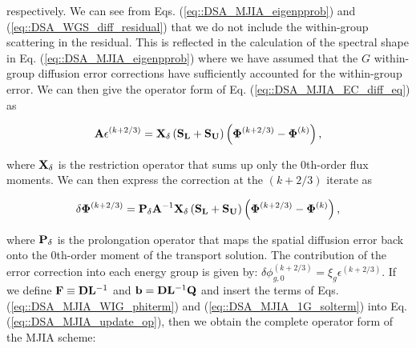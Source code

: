 \noindent respectively. We can see from Eqs. (\ref{eq::DSA_MJIA_eigenpprob}) and (\ref{eq::DSA_WGS_diff_residual}) that we do not include the within-group scattering in the residual. This is reflected in the calculation of the spectral shape in Eq. (\ref{eq::DSA_MJIA_eigenpprob}) where we have assumed that the $G$ within-group diffusion error corrections have sufficiently accounted for the within-group error. We can then give the operator form of Eq. (\ref{eq::DSA_MJIA_EC_diff_eq}) as

\begin{equation}
\label{eq::DSA_MJIA_1G_err_eq_op}
{\bf A} \epsilon^{(k+2/3)}  =  {\bf X}_{\delta}\left(   {\bf S_L} +  {\bf S_U} \right) \left(  {\bf \Phi}^{(k+2/3)} - {\bf \Phi}^{(k)}  \right),
\end{equation}

\noindent where ${\bf X}_{\delta}$ is the restriction operator that sums up only the 0th-order flux moments. We can then express the correction at the $(k+2/3)$ iterate as

\begin{equation}
\label{eq::DSA_MJIA_1G_solterm}
  \delta {\bf \Phi}^{(k+2/3)}  ={\bf P}_{\delta}{\bf A}^{-1}  {\bf X}_{\delta}\left(   {\bf S_L} +  {\bf S_U} \right) \left(  {\bf \Phi}^{(k+2/3)} - {\bf \Phi}^{(k)}  \right),
\end{equation}

\noindent where ${\bf P}_{\delta}$ is the prolongation operator that maps the spatial diffusion error back onto the 0th-order moment of the transport solution. The contribution of the error correction into each energy group is given by: $\delta \phi_{g,0}^{(k+2/3)}=\xi_g \epsilon^{(k+2/3)}$. If we define ${\bf F} \equiv {\bf D}{\bf L}^{-1} $ and ${\bf b} = {\bf D}{\bf L}^{-1}  {\bf Q}$ and insert the terms of Eqs. (\ref{eq::DSA_MJIA_WIG_phiterm}) and (\ref{eq::DSA_MJIA_1G_solterm}) into Eq. (\ref{eq::DSA_MJIA_update_op}), then we obtain the complete operator form of the MJIA scheme:

